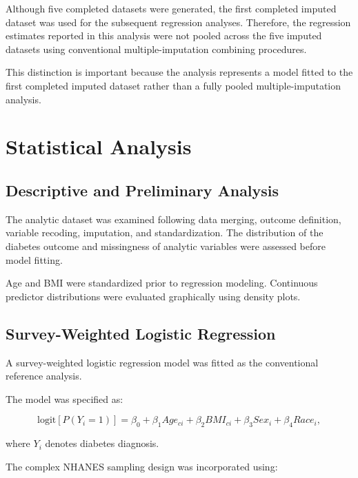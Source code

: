 \documentclass[12pt]{article}
\begin{document}
Although five completed datasets were generated, the first completed imputed dataset was used for the subsequent regression analyses. Therefore, the regression estimates reported in this analysis were not pooled across the five imputed datasets using conventional multiple-imputation combining procedures.

This distinction is important because the analysis represents a model fitted to the first completed imputed dataset rather than a fully pooled multiple-imputation analysis.


\section{Statistical Analysis}

\subsection{Descriptive and Preliminary Analysis}

The analytic dataset was examined following data merging, outcome definition, variable recoding, imputation, and standardization. The distribution of the diabetes outcome and missingness of analytic variables were assessed before model fitting.

Age and BMI were standardized prior to regression modeling. Continuous predictor distributions were evaluated graphically using density plots.


\subsection{Survey-Weighted Logistic Regression}

A survey-weighted logistic regression model was fitted as the conventional reference analysis.

The model was specified as:

\[
\text{logit}\left[P(Y_i=1)\right]
=
\beta_0+
\beta_1Age_{ci}+
\beta_2BMI_{ci}+
\beta_3Sex_i+
\beta_4Race_i,
\]

where \(Y_i\) denotes diabetes diagnosis.

The complex NHANES sampling design was incorporated using:
\end{document}

